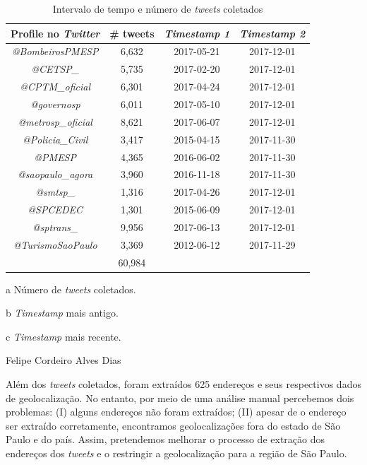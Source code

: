 \documentclass[
	12pt,				%
	oneside,			%
	a4paper,			%
	english,			%
	brazil				%
	]{abntex2ppgsi}
\begin{document}
\begin{table}[!htb]
\centering
\caption{Intervalo de tempo e número de \textit{tweets} coletados}
	\label{tab:tweetsCollected}
\begin{threeparttable}
\begin{tabular}{c|c|c|c}
\toprule
\textbf {Profile no \textit{Twitter}} &\textbf{ \# tweets \tnote{a}}  &\textbf{ \textit{Timestamp 1 \tnote{b}}} & \textbf{\textit{Timestamp 2 \tnote{c}}} \\ 
\midrule
\textit{@BombeirosPMESP} & 6,632 & 2017-05-21 & 2017-12-01 \\
\hline
\textit{@CETSP\_} & 5,735 & 2017-02-20  & 2017-12-01 \\
\hline
\textit{@CPTM\_oficial} & 6,301 & 2017-04-24 & 2017-12-01 \\
\hline
\textit{@governosp}  & 6,011 & 2017-05-10 & 2017-12-01 \\
\hline
\textit{@metrosp\_oficial} & 8,621 & 2017-06-07 & 2017-12-01 \\
\hline
\textit{@Policia\_Civil}  & 3,417 & 2015-04-15 & 2017-11-30 \\
\hline
\textit{@PMESP}  & 4,365 & 2016-06-02 & 2017-11-30 \\
\hline
\textit{@saopaulo\_agora}  & 3,960 & 2016-11-18 & 2017-11-30 \\
\hline
\textit{@smtsp\_} & 1,316 & 2017-04-26 & 2017-12-01 \\
\hline
\textit{@SPCEDEC} & 1,301 & 2015-06-09 & 2017-12-01 \\
\hline
\textit{@sptrans\_} & 9,956 & 2017-06-13 & 2017-12-01 \\
\hline
\textit{@TurismoSaoPaulo} & 3,369 & 2012-06-12 & 2017-11-29 \\
\midrule
\textbf {} & 60,984 & {} & {} \\
\bottomrule
\end{tabular}
\begin{tablenotes}
            \item[a] Número de \textit{tweets} coletados.
            \item[b] \textit{Timestamp} mais antigo.
            \item[c] \textit{Timestamp} mais recente.
        \end{tablenotes}
\end{threeparttable}
 Felipe Cordeiro Alves Dias
\end{table}

Além dos \textit{tweets} coletados, foram extraídos 625 endereços e seus respectivos dados de geolocalização. No entanto, por meio de uma análise manual percebemos dois problemas: (I) alguns endereços não foram extraídos; (II) apesar de o endereço ser extraído corretamente, encontramos geolocalizações fora do estado de São Paulo e do país. Assim, pretendemos melhorar o processo de extração dos endereços dos \textit{tweets} e o restringir a geolocalização para a região de São Paulo. 
\end{document}
